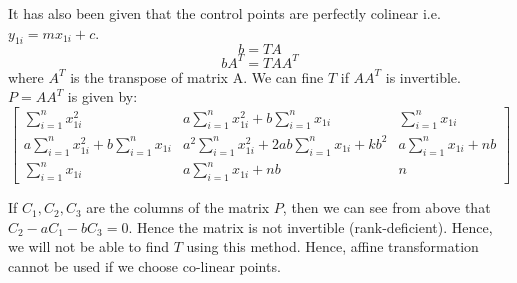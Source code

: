 \documentclass[12pt]{article}
\begin{document}
It has also been given that the control points are perfectly colinear i.e. $y_{1i} = mx_{1i}+c$. 
\[b = TA\]
\[bA^T = TAA^T\]
where $A^T$ is the transpose of matrix A. We can fine $T$ if $AA^T$ is invertible. $P = AA^T$ is given by:
\[
    \begin{bmatrix}
        \sum_{i=1}^nx_{1i}^2 & a\sum_{i=1}^nx_{1i}^2 + b\sum_{i=1}^nx_{1i} & \sum_{i=1}^nx_{1i}\\
        a\sum_{i=1}^nx_{1i}^2 + b\sum_{i=1}^nx_{1i} &  a^2\sum_{i=1}^nx_{1i}^2 + 2ab\sum_{i=1}^nx_{1i} + kb^2 & a\sum_{i=1}^nx_{1i} + nb\\
        \sum_{i=1}^nx_{1i} & a\sum_{i=1}^nx_{1i} + nb & n
    \end{bmatrix}
\]

If $C_1, C_2, C_3$ are the columns of the matrix $P$, then we can see from above that $C_2 - aC_1 - bC_3 = 0$. Hence the matrix is not invertible (rank-deficient). Hence, we will not be able to find $T$ using this method. Hence, affine transformation cannot be used if we choose co-linear points.
\end{document}
